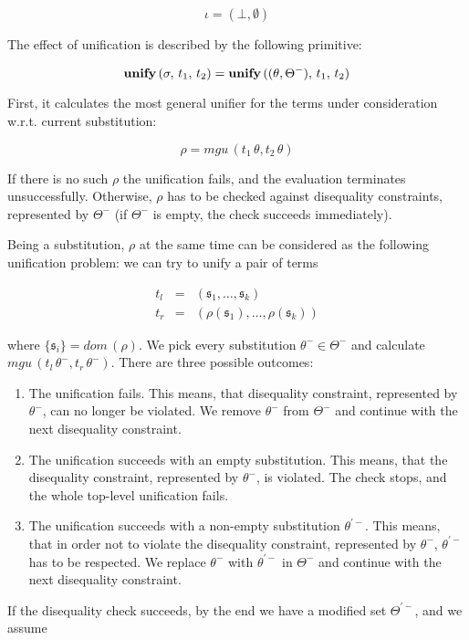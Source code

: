 $$
\iota=(\bot,\emptyset)
$$

The effect of unification is described by the following primitive:

$$
{\bf unify}\,(\sigma,\,t_1,\,t_2)={\bf unify}\,((\theta,\Theta^-),\,t_1,\,t_2)
$$

First, it calculates the most general unifier for the terms under consideration w.r.t. current substitution:

$$
\rho=mgu\,(t_1\,\theta,t_2\,\theta)
$$

If there is no such $\rho$ the unification fails, and the evaluation terminates unsuccessfully. Otherwise,
$\rho$ has to be checked against disequality constraints, represented by $\Theta^-$ (if $\Theta^-$ is empty, the
check succeeds immediately).

Being a substitution, $\rho$ at the same time can be considered as the following unification problem: we can try to unify a pair of terms 

$$
\begin{array}{rcl}
t_l&=&(\mathfrak s_1,\dots,\mathfrak s_k)\\
t_r&=&(\rho(\mathfrak s_1),\dots,\rho(\mathfrak s_k))
\end{array}
$$

\noindent where $\{\mathfrak s_i\}=dom\,(\rho)$. We pick every substitution $\theta^-\in\Theta^-$ and calculate 
$mgu\,(t_l\,\theta^-,t_r\,\theta^-)$. There are three possible outcomes:

\begin{enumerate}
\item The unification fails. This means, that disequality constraint, represented by $\theta^-$, can no
longer be violated. We remove $\theta^-$ from $\Theta^-$ and continue with the next disequality constraint.
\item The unification succeeds with an empty substitution. This means, that the
disequality constraint, represented by $\theta^-$, is violated. The check stops, and the whole top-level 
unification fails.
\item The unification succeeds with a non-empty substitution $\theta^{\prime-}$. This means, that in order not to 
violate the disequality constraint, represented by $\theta^-$, $\theta^{\prime-}$ has to be respected. We replace
$\theta^-$ with $\theta^{\prime-}$ in $\Theta^-$ and continue with the next disequality constraint.
\end{enumerate}

If the disequality check succeeds, by the end we have a modified set $\Theta^{\prime-}$, and we assume

